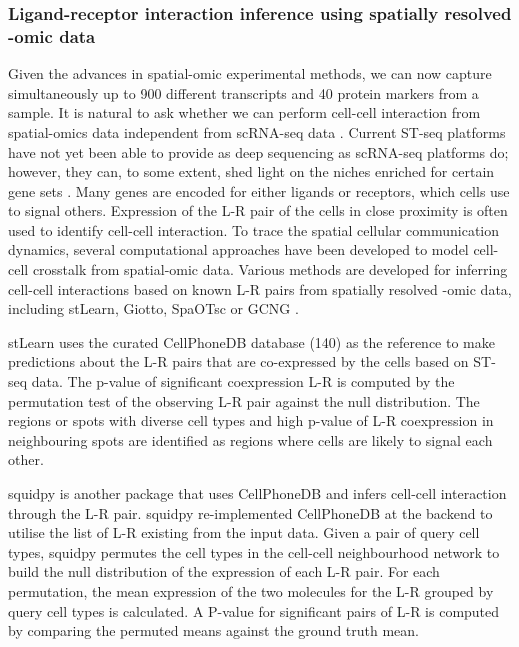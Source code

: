 \subsubsection{Ligand-receptor interaction inference using spatially resolved -omic data}
Given the advances in spatial-omic experimental methods, we can now capture simultaneously up to 900 different transcripts and 40 protein markers from a sample. It is natural to ask whether we can perform cell-cell interaction from spatial-omics data independent from scRNA-seq data \cite{moses2022museum}. Current ST-seq platforms have not yet been able to provide as deep sequencing as scRNA-seq platforms do; however, they can, to some extent, shed light on the niches enriched for certain gene sets \cite{Bost2022Optimizing}. Many genes are encoded for either ligands or receptors, which cells use to signal others. Expression of the L-R pair of the cells in close proximity is often used to identify cell-cell interaction. To trace the spatial cellular communication dynamics, several computational approaches have been developed to model cell-cell crosstalk from spatial-omic data. Various methods are developed for inferring cell-cell interactions based on known L-R pairs from spatially resolved -omic data, including stLearn, Giotto, SpaOTsc or GCNG \cite{pham2020stlearn, dries2021giotto, cang2020inferring, yuan2020gcng}.  

stLearn \cite{pham2020stlearn} uses the curated CellPhoneDB database (140) as the reference to make predictions about the L-R pairs that are co-expressed by the cells based on ST-seq data. The p-value of significant coexpression L-R is computed by the permutation test of the observing L-R pair against the null distribution. The regions or spots with diverse cell types and high p-value of L-R coexpression in neighbouring spots are identified as regions where cells are likely to signal each other. 

squidpy \cite{palla2022squidpy} is another package that uses CellPhoneDB and infers cell-cell interaction through the L-R pair. squidpy re-implemented CellPhoneDB at the backend to utilise the list of L-R existing from the input data. Given a pair of query cell types, squidpy permutes the cell types in the cell-cell neighbourhood network to build the null distribution of the expression of each L-R pair. For each permutation, the mean expression of the two molecules for the L-R grouped by query cell types is calculated. A P-value for significant pairs of L-R is computed by comparing the permuted means against the ground truth mean.

